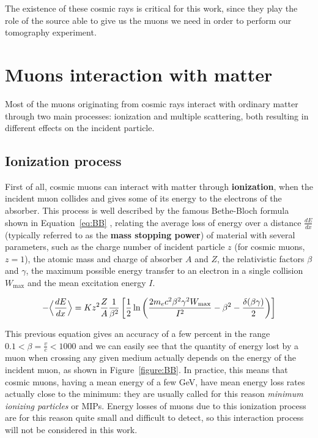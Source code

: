 \documentclass[a4paper, 11pt, twoside, openright]{report}
\begin{document}
The existence of these cosmic rays is critical for this work, since they play the role of the source able to give us the muons we need in order to perform our tomography experiment.

\section{Muons interaction with matter} \label{sec:interactions}

Most of the muons originating from cosmic rays interact with ordinary matter through two main processes: ionization and multiple scattering, both resulting in different effects on the incident particle.

\subsection{Ionization process}

First of all, cosmic muons can interact with matter through \textbf{ionization}, when the incident muon collides and gives some of its energy to the electrons of the absorber. This process is well described by the famous Bethe-Bloch formula shown in Equation~\ref{eq:BB} \cite{PDGMuons}, relating the average loss of energy over a distance $\frac{dE}{dx}$ (typically referred to as the \textbf{mass stopping power}) of material with several parameters, such as the charge number of incident particle $z$ (for cosmic muons, $z = 1$), the atomic mass and charge of absorber $A$ and $Z$, the relativistic factors $\beta$ and $\gamma$, the maximum possible energy transfer to an electron in a single collision $W_{\text{max}}$ and the mean excitation energy $I$.

\begin{equation}
\label{eq:BB}
- \Bigl \langle \frac{dE}{dx} \Bigr \rangle = K z^2 \frac{Z}{A} \frac{1}{\beta^2} \left [\frac{1}{2} \ln \left (\frac{2 m_e c^2 \beta^2 \gamma^2 W_{\text{max}}}{I^2} - \beta^2 - \frac{\delta(\beta \gamma)}{2} \right ) \right ]
\end{equation}

This previous equation gives an accuracy of a few percent in the range $0.1 < \beta = \frac{v}{c} < 1000$ and we can easily see that the quantity of energy lost by a muon when crossing any given medium actually depends on the energy of the incident muon, as shown in Figure~\ref{figure:BB}. In practice, this means that cosmic muons, having a mean energy of a few GeV, have mean energy loss rates actually close to the minimum: they are usually called for this reason \textit{minimum ionizing particles} or MIPs. Energy losses of muons due to this ionization process are for this reason quite small and difficult to detect, so this interaction process will not be considered in this work.
\end{document}
